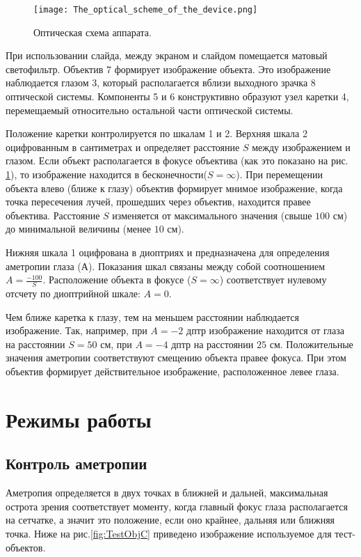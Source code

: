 \begin{figure}[ht]
	\centering
     \texttt{[image: The\_optical\_scheme\_of\_the\_device.png]}
	\caption{Оптическая схема аппарата.}
	\label{fig:OpticSche}
\end{figure}

При использовании слайда, между экраном и слайдом помещается матовый светофильтр. Объектив 7 формирует изображение объекта. Это изображение наблюдается глазом 3, который располагается вблизи выходного зрачка 8 оптической системы. Компоненты 5 и 6 конструктивно образуют узел каретки 4, перемещаемый относительно остальной части оптической системы. 

Положение каретки контролируется по шкалам 1 и 2. Верхняя шкала 2 оцифрованным в сантиметрах и определяет расстояние $S$ между изображением и глазом. Если объект располагается в фокусе объектива (как это показано на рис. \ref{fig:OpticSche}), то изображение находится в бесконечности($ S=\infty $). При перемещении объекта влево (ближе к глазу) объектив формирует мнимое изображение, когда точка пересечения лучей, прошедших через объектив, находится правее объектива. Расстояние $S$ изменяется от максимального значения (свыше $100$ см) до минимальной величины (менее $10$ см).

Нижняя шкала 1 оцифрована в диоптриях и предназначена для определения аметропии глаза (А). Показания шкал связаны между собой соотношением $ A=\frac{-100}{S}$. Расположение объекта в фокусе  ($ S=\infty $) соответствует нулевому отсчету по диоптрийной шкале: $A=0$.

Чем ближе каретка к глазу, тем на меньшем расстоянии наблюдается изображение. Так, например, при $A=-2$ дптр изображение находится от глаза на расстоянии $S=50$ см, при $A =-4$ дптр на расстоянии $25$ см.
Положительные значения аметропии соответствуют смещению объекта правее фокуса. При этом объектив формирует действительное изображение, расположенное левее глаза.

\section{Режимы работы}
\subsection{Контроль аметропии}
Аметропия определяется в двух точках в ближней и дальней, максимальная острота зрения соответствует моменту, когда главный фокус глаза располагается на сетчатке, а значит это положение, если оно крайнее, дальняя или ближняя точка. Ниже на рис.\ref{fig:TestObjC} приведено изображение используемое для тест-объектов.

